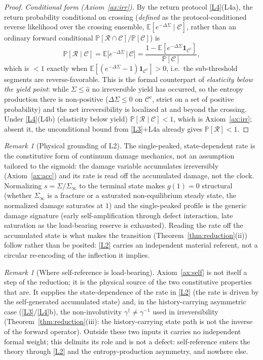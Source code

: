 \documentclass[11pt]{article}
\theoremstyle{plain}
\theoremstyle{definition}
\theoremstyle{remark}
\newtheorem{remark}[theorem]{Remark}
\newcommand{\E}{\mathbb{E}}
\begin{document}
\begin{proof}
\emph{Conditional form (Axiom~\ref{ax:irr}).} By the return protocol \ref{L4}(L4a), the return probability conditional on crossing (\emph{defined} as the protocol-conditioned reverse likelihood over the crossing ensemble, $\E[e^{-\Delta\Sigma}\mid\mathcal C]$, rather than an ordinary forward conditional $\mathbb P[\mathcal R\cap\mathcal C]/\mathbb P[\mathcal C]$) is
\[
\mathbb P[\mathcal R\mid\mathcal C]=\E\!\big[e^{-\Delta\Sigma}\,\big|\,\mathcal C\big]=\frac{1-\E[e^{-\Delta\Sigma}\mathbf 1_{\mathcal C^c}]}{\mathbb P[\mathcal C]},
\]
which is $<1$ exactly when $\E[(e^{-\Delta\Sigma}-1)\mathbf 1_{\mathcal C^c}]>0$, i.e.\ the sub-threshold segments are reverse-favorable. This is the formal counterpart of \emph{elasticity below the yield point}: while $\Sigma\le\hat a$ no irreversible yield has occurred, so the entropy production there is non-positive ($\Delta\Sigma\le0$ on $\mathcal C^c$, strict on a set of positive probability) and the net irreversibility is localized at and beyond the crossing. Under \ref{L4}(L4b) (elasticity below yield) $\mathbb P[\mathcal R\mid\mathcal C]<1$, which is Axiom~\ref{ax:irr}; absent it, the unconditional bound from \ref{L3}$+$L4a already gives $\mathbb P[\mathcal R]<1$.
\end{proof}

\begin{remark}[Physical grounding of L2]\label{rem:damagelaw}
The single-peaked, state-dependent rate is the constitutive form of continuum damage mechanics, not an assumption tailored to the sigmoid: the damage variable accumulates irreversibly (Axiom~\ref{ax:acc}) and its rate is read off the accumulated damage, not the clock. Normalizing $s=\Sigma/\Sigma_\infty$ to the terminal state makes $g(1)=0$ structural (whether $\Sigma_\infty$ is a fracture or a saturated non-equilibrium steady state, the normalized damage saturates at $1$) and the single-peaked profile is the generic damage signature (early self-amplification through defect interaction, late saturation as the load-bearing reserve is exhausted). Reading the rate off the accumulated state is what makes the transition (Theorem~\ref{thm:reduction}(ii)) follow rather than be posited: \ref{L2} carries an independent material referent, not a circular re-encoding of the inflection it implies.
\end{remark}

\begin{remark}[Where self-reference is load-bearing]\label{rem:a0role}
Axiom~\ref{ax:self} is not itself a step of the reduction; it is the physical source of the two constitutive properties that are. It supplies the state-dependence of the rate in \ref{L2} (the rate is driven by the self-generated accumulated state) and, in the history-carrying asymmetric case (\ref{L3}/\ref{L4}b), the non-involutivity $\gamma^\dagger\neq\gamma^{-1}$ used in irreversibility (Theorem~\ref{thm:reduction}(iii): the history-carrying state path is not the inverse of the forward operator). Outside these two inputs it carries no independent formal weight; this delimits its role and is not a defect: self-reference enters the theory through \ref{L2} and the entropy-production asymmetry, and nowhere else.
\end{remark}
\end{document}
